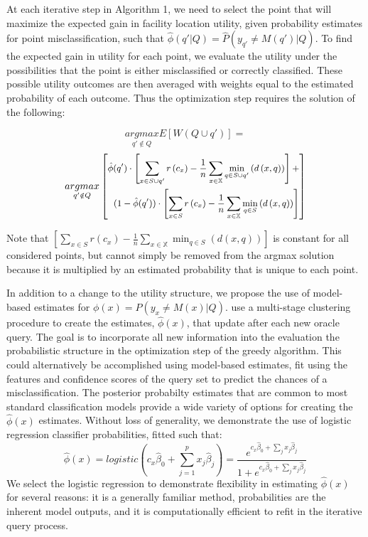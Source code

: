 \documentclass[letterpaper]{article} %
\begin{document}
At each iterative step in Algorithm 1, we need to select the point that will maximize the expected gain in facility location utility, given probability estimates for point misclassification, such that  $\hat{\phi}(q' | Q) = \hat{P}(y_{q'} \ne M(q' ) |  Q )$. To find the expected gain in utility for each point, we evaluate the utility under the possibilities that the point is either misclassified or correctly classified. These possible utility outcomes are then averaged with weights equal to the estimated probability of each outcome. Thus the optimization step requires the solution of the following:

$$\underset{q' \notin Q}{argmax} E[W(Q \cup q')] = $$
\begin{equation*}
\small
\underset{q' \notin Q}{argmax} \left[\begin{split}
\hat{\phi}(q') \cdot \left[\sum_{x \in S \cup q'} r \left(c_x\right) - \frac{1}{n} \sum_{x \in \mathbb{X}} \min_{q \in S \cup q'}\left(d\left(x,q\right)\right) \right] + \\ 
(1-\hat{\phi}(q')) \cdot \left[\sum_{x \in S} r \left(c_x\right) - \frac{1}{n} \sum_{x \in \mathbb{X}} \min_{q \in S}\left(d\left(x,q\right)\right)\right]  
\end{split}\right]
\end{equation*}
\normalsize

Note that $\left[\sum_{x \in S} r \left(c_x\right) - \frac{1}{n} \sum_{x \in \mathbb{X}} \min_{q \in S}\left(d\left(x,q\right)\right)\right]$ is constant for all considered points, but cannot simply be removed from the argmax solution because it is multiplied by an estimated probability that is unique to each point. 

In addition to a change to the utility structure, we propose the use of model-based estimates for $\phi(x) = P\left(y_x \neq M(x) |Q \right)$. \citet{Bansal2018} use a multi-stage clustering procedure to create the estimates, $\hat{\phi}(x)$, that update after each new oracle query. The goal is to incorporate all new information into the evaluation the probabilistic structure in the optimization step of the greedy algorithm. This could alternatively be accomplished using model-based estimates, fit using the features and confidence scores of the query set to predict the chances of a misclassification. The posterior probabilty estimates that are common to most standard classification models provide a wide variety of options for creating the $\hat{\phi}(x)$ estimates. Without loss of generality, we demonstrate the use of logistic regression classifier probabilities, fitted such that:
$$\hat{\phi}(x) = logistic(c_x\hat{\beta}_0 + \sum_{j=1}^p x_j\hat{\beta}_j) = \frac{e^{c_x\hat{\beta}_0 + \sum_j x_j\hat{\beta}_j}}{1+e^{c_x\hat{\beta}_0 + \sum_j x_j\hat{\beta}_j}}$$
We select the logistic regression to demonstrate flexibility in estimating $\hat{\phi}(x)$ for several reasons: it is a generally familiar method, probabilities are the inherent model outputs, and it is computationally efficient to refit in the iterative query process. 
\end{document}
